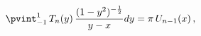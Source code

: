 \[\pvint_{-1}^{1}\mathop{T_{n}\/}\nolimits\!\left(y\right)\frac{(1-y^{2})^{-%
\frac{1}{2}}}{y-x}dy=\pi\mathop{U_{n-1}\/}\nolimits\!\left(x\right),\]